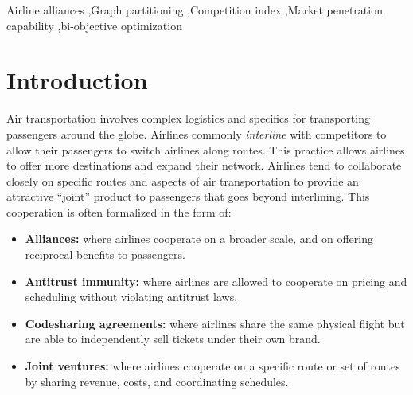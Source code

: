 \documentclass[preprint,times]{elsarticle}
\def\mfabian#1{{\color{black} #1}}
\def\hfabian#1{}
\begin{document}
\begin{frontmatter}
\begin{abstract}
\end{abstract}

\begin{keyword}
Airline alliances \sep Graph partitioning \sep Competition index \sep Market penetration capability \sep bi-objective optimization





\end{keyword}
\end{frontmatter}




\section{Introduction} \label{sec:introduction}

Air transportation involves complex logistics and specifics for transporting passengers around the globe.
Airlines commonly \textit{interline} with \mfabian{competitors}\hfabian{other airlines} to allow their passengers to switch airlines along routes.
This practice allows airlines to offer \hfabian{their passengers} more destinations and expand their network.
Airlines tend to collaborate closely on specific routes and aspects of air transportation to provide an attractive ``joint'' product to passengers that goes beyond interlining. This cooperation is often formalized in the form of:
\begin{itemize}
	\item \textbf{Alliances:} where airlines cooperate on a broader scale, and on offering reciprocal benefits to passengers.
	\item \textbf{Antitrust immunity:} where airlines are allowed to cooperate on pricing and scheduling without violating antitrust laws.
	\item \textbf{Codesharing agreements:} where airlines share the same physical flight but are able to independently sell tickets under their own brand.
	\item \textbf{Joint ventures:} where airlines cooperate on a specific route or set of routes by sharing revenue, costs, and coordinating schedules.
\end{itemize}
\end{document}
